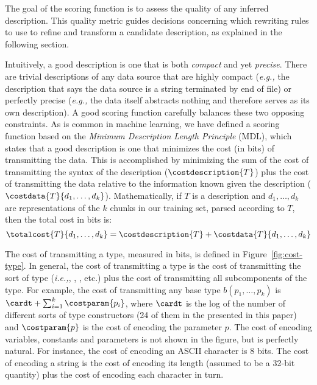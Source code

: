 The goal of the scoring function is to assess the quality of any
inferred description.  This quality metric guides decisions concerning
which rewriting rules to use to refine and transform a candidate
description, as explained in the following section.

Intuitively, a good description is one that is both {\em compact} and
yet {\em precise}.  There are trivial descriptions of any data source
that are highly compact ({\em e.g.,} the description that says
the data source is a string terminated by end of file) or
perfectly precise ({\em e.g.,} the data itself abstracts nothing and
therefore serves as its own description).  A good scoring function
carefully balances these two opposing constraints.  As is common
in machine learning, we have defined a scoring function based on the
{\em Minimum Description Length Principle} (MDL), which states that
a good description is one that minimizes the cost (in bits) of transmitting
the data.  This is accomplished by minimizing 
the sum of the cost of transmitting
the syntax of the description ($\costdescription{T}$)
plus the cost of transmitting the data 
relative to the information known given the description
($\costdata{T}{d_1,\ldots,d_k}$).  Mathematically,
if $T$ is a description and $d_1,\ldots,d_k$ are representations of
the $k$ chunks in our training set, parsed according to $T$, then the 
total cost in bits is:
\[
\totalcost{T}{d_1,\ldots,d_k} = \costdescription{T} + \costdata{T}{d_1,\ldots,d_k}
\]

The cost of transmitting a type, measured in bits, is defined in 
Figure~\ref{fig:cost-type}.  In general, the cost of transmitting
a type is the cost of transmitting the sort of type ({\em i.e.,},
, , etc.) plus the cost of transmitting all subcomponents
of the type.  For example, the cost of transmitting any base type
$b(p_1,\ldots,p_k)$ is $ \cardt + \sum_{i=1}^{k} \costparam{p_i}$,
where $\cardt$ is the log of the number of different sorts of type 
constructors (24 of them in the \ir{} presented in this paper)
and $\costparam{p}$ is the cost of encoding the parameter $p$.
The cost of encoding variables, constants and parameters is not
shown in the figure, but is perfectly natural.  For instance, the cost of
encoding an ASCII character is 8 bits.  The cost of encoding a string
is the cost of encoding its length (assumed to be a 32-bit quantity)
plus the cost of encoding each character in turn.

